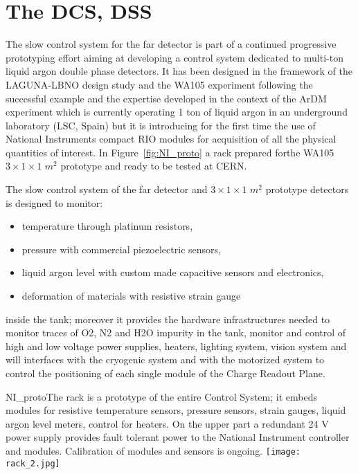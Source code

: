 \section{The DCS, DSS} 
\label{sec:detectors-fd-alt-dcs}

The slow control system for the far detector is part of a
continued progressive prototyping effort aiming at developing a
control system dedicated to multi-ton liquid argon double phase
detectors. It has been designed in the framework of the LAGUNA-LBNO design study and the WA105 experiment following the successful example and
the expertise developed in the context of the ArDM experiment  \cite{Badertscher:2013ygt}
which is currently operating 1 ton of liquid argon in an underground
laboratory (LSC, Spain) but it is introducing for the first time the use of National Instruments
compact RIO modules for acquisition of all the physical quantities of
interest. In Figure~\ref{fig:NI_proto} a rack prepared forthe WA105  $3 \times 1 \times 1$ $m^2$ prototype and ready to be tested at CERN.

 The slow control system of the far detector and $3 \times 1 \times 1$ $m^2$ prototype detectors is designed to monitor:
\begin{itemize}
  \item temperature through platinum resistors,
  \item pressure with commercial piezoelectric sensors,
  \item liquid argon level with custom made capacitive sensors and electronics,
  \item deformation of materials with resistive strain gauge
\end{itemize} 

inside the tank; moreover it provides the hardware
infrastructures needed to monitor traces of O2, N2 and H2O impurity in the tank, monitor and control of high
and low voltage power supplies, heaters, lighting system, vision
system and will interfaces with the cryogenic system and with the
motorized system to control the positioning of each single module of the Charge Readout Plane. 


\begin{cdrfigure}{NI_proto}{The rack is a prototype of the entire Control System; it  embeds modules for resistive temperature sensors, pressure  sensors, strain gauges, liquid argon level meters, control for  heaters. On the upper part a redundant 24 V power supply provides
 fault tolerant power to the National Instrument controller and modules. Calibration of modules and sensors is ongoing.}
\texttt{[image: rack\_2.jpg]}
\end{cdrfigure}


